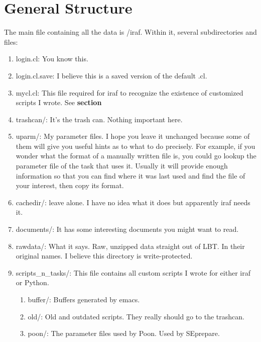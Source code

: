 \documentclass{article}
\begin{document}
\section{General Structure}
The main file containing all the data is /iraf. Within it, several subdirectories and files:\\
\begin{enumerate}
\item login.cl: You know this.\\
\item login.cl.save: I believe this is a saved version of the default .cl.\\
\item mycl.cl: This file required for iraf to recognize the existence of customized scripts I wrote. See \textbf{section}\\
\item trashcan/: It's the trash can. Nothing important here.\\
\item uparm/: My parameter files. I hope you leave it unchanged because some of them will give you useful hints as to what to do precisely. For example, if you wonder what the format of a manually written file is, you could go lookup the parameter file of the task that uses it. Usually it will provide enough information so that you can find where it was last used and find the file of your interest, then copy its format.\\
\item cachedir/: leave alone. I have no idea what it does but apparently iraf needs it.\\
\item documents/: It has some interesting documents you might want to read.\\
\item rawdata/: What it says. Raw, unzipped data straight out of LBT. In their original names. I believe this directory is write-protected.\\
\item scripts\_n\_tasks/: This file contains all custom scripts I wrote for either iraf or Python.
\begin{enumerate}
\item buffer/: Buffers generated by emacs.\\
\item old/: Old and outdated scripts. They really should go to the trashcan.\\
\item poon/: The parameter files used by Poon. Used by SEprepare. \\

\end{enumerate}
\end{enumerate}
\end{document}
